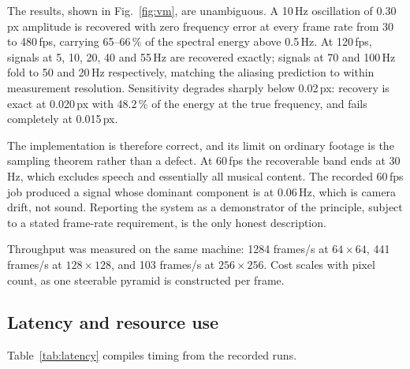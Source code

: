 \documentclass[conference]{IEEEtran}
\begin{document}
The results, shown in Fig.~\ref{fig:vm}, are unambiguous. A 10\,Hz oscillation of
0.30\,px amplitude is recovered with zero frequency error at every frame rate
from 30 to 480\,fps, carrying 65--66\,\% of the spectral energy above 0.5\,Hz. At
120\,fps, signals at 5, 10, 20, 40 and 55\,Hz are recovered exactly; signals at 70
and 100\,Hz fold to 50 and 20\,Hz respectively, matching the aliasing prediction
to within measurement resolution. Sensitivity degrades sharply below 0.02\,px:
recovery is exact at 0.020\,px with 48.2\,\% of the energy at the true frequency,
and fails completely at 0.015\,px.

The implementation is therefore correct, and its limit on ordinary footage is the
sampling theorem rather than a defect. At 60\,fps the recoverable band ends at
30\,Hz, which excludes speech and essentially all musical content. The
recorded 60\,fps job produced a signal whose dominant component is at 0.06\,Hz,
which is camera drift, not sound. Reporting the system as a demonstrator of the
principle, subject to a stated frame-rate requirement, is the only honest
description.

Throughput was measured on the same machine: 1284 frames/s at $64\times64$,
441 frames/s at $128\times128$, and 103 frames/s at $256\times256$. Cost scales
with pixel count, as one steerable pyramid is constructed per frame.

\subsection{Latency and resource use}

Table~\ref{tab:latency} compiles timing from the recorded runs.
\end{document}
